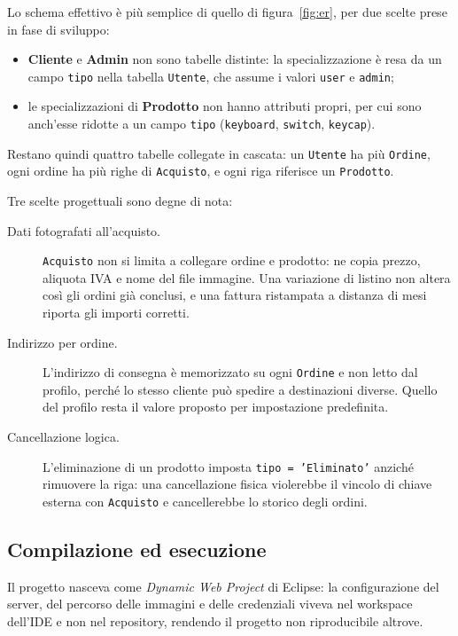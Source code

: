\documentclass[11pt,a4paper]{article}
\begin{document}
Lo schema effettivo è più semplice di quello di figura~\ref{fig:er}, per due
scelte prese in fase di sviluppo:

\begin{itemize}
  \item \textbf{Cliente} e \textbf{Admin} non sono tabelle distinte: la
        specializzazione è resa da un campo \texttt{tipo} nella tabella
        \texttt{Utente}, che assume i valori \texttt{user} e \texttt{admin};
  \item le specializzazioni di \textbf{Prodotto} non hanno attributi propri, per
        cui sono anch'esse ridotte a un campo \texttt{tipo}
        (\texttt{keyboard}, \texttt{switch}, \texttt{keycap}).
\end{itemize}

Restano quindi quattro tabelle collegate in cascata: un \texttt{Utente} ha più
\texttt{Ordine}, ogni ordine ha più righe di \texttt{Acquisto}, e ogni riga
riferisce un \texttt{Prodotto}.

Tre scelte progettuali sono degne di nota:

\begin{description}
  \item[Dati fotografati all'acquisto.] \texttt{Acquisto} non si limita a
    collegare ordine e prodotto: ne copia prezzo, aliquota IVA e nome del file
    immagine. Una variazione di listino non altera così gli ordini già conclusi,
    e una fattura ristampata a distanza di mesi riporta gli importi corretti.
  \item[Indirizzo per ordine.] L'indirizzo di consegna è memorizzato su ogni
    \texttt{Ordine} e non letto dal profilo, perché lo stesso cliente può
    spedire a destinazioni diverse. Quello del profilo resta il valore proposto
    per impostazione predefinita.
  \item[Cancellazione logica.] L'eliminazione di un prodotto imposta
    \texttt{tipo = 'Eliminato'} anziché rimuovere la riga: una cancellazione
    fisica violerebbe il vincolo di chiave esterna con \texttt{Acquisto} e
    cancellerebbe lo storico degli ordini.
\end{description}

\subsection{Compilazione ed esecuzione}

Il progetto nasceva come \emph{Dynamic Web Project} di Eclipse: la configurazione
del server, del percorso delle immagini e delle credenziali viveva nel workspace
dell'IDE e non nel repository, rendendo il progetto non riproducibile altrove.
\end{document}
